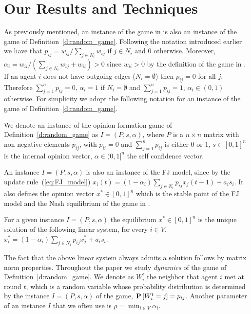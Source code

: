 \section{Our Results and Techniques}\label{s:results}
As previously mentioned, an instance of the game in \cite{BKO11}
is also an instance of the game of Definition~\ref{d:random_game}.
Following the notation introduced earlier we have that
$p_{ij} = w_{ij}/\sum_{j \in N_i}w_{ij}$ if $j \in N_i$ and $0$ otherwise.
Moreover, $\alpha_i=w_{ii}/(\sum_{j \in N_i}w_{ij}+w_{ii})>0$ since $w_{ii}>0$
by the definition of the game in \cite{BKO11}.
If an agent $i$ does not have outgoing edges ($N_i = \emptyset$) then
$p_{ij} = 0$ for all $j$. Therefore $\sum_{j=1}^n p_{ij}=0$, $\alpha_i=1$ if $N_i= \emptyset$
and $\sum_{j=1}^n p_{ij}=1$, $\alpha_i \in (0,1)$ otherwise.
For simplicity we adopt the following notation for
an instance of the game of Definition~\ref{d:random_game}.
%
\begin{definition}\label{d:instance}
  We denote an instance of the opinion formation game of Definition~\ref{d:random_game}
  as $I=(P,s,\alpha)$, where
    $P$ is a $n \times n$  matrix with non-negative elements $p_{ij}$,
      with $p_{ii}=0$ and $\sum_{j=1}^n p_{ij}$ is either $0$ or $1$,
    $s \in [0,1]^n$ is the internal opinion vector,
    $\alpha \in (0,1]^n$ the self confidence vector.
\end{definition}
%

An instance $I=(P,s,\alpha)$ is also an instance
of the FJ model, since by the update rule~(\ref{eq:FJ_model})
$x_i(t)=(1-\alpha_i)\sum_{j \in N_i}p_{ij}x_j(t-1) + a_i s_i$.
It also defines the opinion vector $x^* \in [0,1]^n$ which is the
stable point of the FJ model and the Nash equilibrium
of the game in \cite{BKO11}.
\begin{definition}
For a given instance $I=(P,s,\alpha)$ the equilibrium
$x^*\in [0,1]^n$ is the unique solution of the following linear system,
for every $i \in V$, $x^*_i=(1-\alpha_i)\sum_{j \in N_i}p_{ij}x_j^* + a_i s_i$.
\end{definition}
The fact that the above linear system always admits a solution follows
by matrix norm properties.
Throughout the paper we study \emph{dynamics} of the game of
Definition~\ref{d:random_game}.  We denote as $W_i^t$ the neighbor that agent $i$
met at round $t$, which is a random variable whose probability distribution is
determined by the instance $I=(P,s,\alpha)$ of the game, $\bm{\mathrm{P}}\left[W_i^t=j\right]=p_{ij}$.
Another parameter of an instance $I$ that we often use is
$\rho=\min_{i \in V}\alpha_i$.

